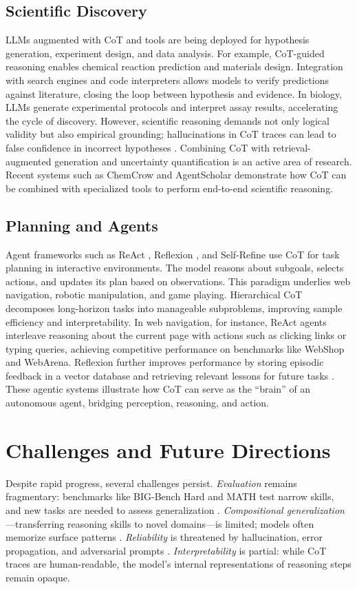 \documentclass[11pt,a4paper]{article}
\begin{document}
\subsection{Scientific Discovery}
LLMs augmented with CoT and tools are being deployed for hypothesis generation, experiment design, and data analysis. For example, CoT-guided reasoning enables chemical reaction prediction \citep{wei2022chain} and materials design. Integration with search engines and code interpreters allows models to verify predictions against literature, closing the loop between hypothesis and evidence. In biology, LLMs generate experimental protocols and interpret assay results, accelerating the cycle of discovery. However, scientific reasoning demands not only logical validity but also empirical grounding; hallucinations in CoT traces can lead to false confidence in incorrect hypotheses \citep{ye2022unreliability}. Combining CoT with retrieval-augmented generation and uncertainty quantification is an active area of research. Recent systems such as ChemCrow and AgentScholar demonstrate how CoT can be combined with specialized tools to perform end-to-end scientific reasoning.

\subsection{Planning and Agents}
Agent frameworks such as ReAct \citep{yao2023react}, Reflexion \citep{shinn2023reflexion}, and Self-Refine \citep{madaan2023self} use CoT for task planning in interactive environments. The model reasons about subgoals, selects actions, and updates its plan based on observations. This paradigm underlies web navigation, robotic manipulation, and game playing. Hierarchical CoT decomposes long-horizon tasks into manageable subproblems, improving sample efficiency and interpretability. In web navigation, for instance, ReAct agents interleave reasoning about the current page with actions such as clicking links or typing queries, achieving competitive performance on benchmarks like WebShop and WebArena. Reflexion further improves performance by storing episodic feedback in a vector database and retrieving relevant lessons for future tasks \citep{shinn2023reflexion}. These agentic systems illustrate how CoT can serve as the ``brain'' of an autonomous agent, bridging perception, reasoning, and action.

\section{Challenges and Future Directions}
\label{sec:challenges}
Despite rapid progress, several challenges persist. \textit{Evaluation} remains fragmentary: benchmarks like BIG-Bench Hard and MATH test narrow skills, and new tasks are needed to assess generalization \citep{srivastava2022beyond}. \textit{Compositional generalization}---transferring reasoning skills to novel domains---is limited; models often memorize surface patterns \citep{min2022rethinking}. \textit{Reliability} is threatened by hallucination, error propagation, and adversarial prompts \citep{ye2022unreliability}. \textit{Interpretability} is partial: while CoT traces are human-readable, the model's internal representations of reasoning steps remain opaque.
\end{document}
